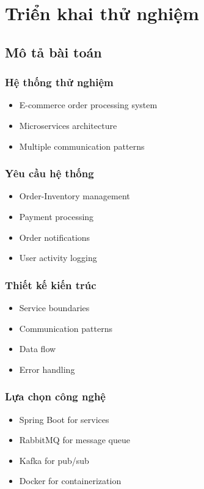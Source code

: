 \chapter{Triển khai thử nghiệm}

\section{Mô tả bài toán}
\subsection{Hệ thống thử nghiệm}
\begin{itemize}
    \item E-commerce order processing system
    \item Microservices architecture
    \item Multiple communication patterns
\end{itemize}

\subsection{Yêu cầu hệ thống}
\begin{itemize}
    \item Order-Inventory management
    \item Payment processing
    \item Order notifications
    \item User activity logging
\end{itemize}

\subsection{Thiết kế kiến trúc}
\begin{itemize}
    \item Service boundaries
    \item Communication patterns
    \item Data flow
    \item Error handling
\end{itemize}

\subsection{Lựa chọn công nghệ}
\begin{itemize}
    \item Spring Boot for services
    \item RabbitMQ for message queue
    \item Kafka for pub/sub
    \item Docker for containerization
\end{itemize}

